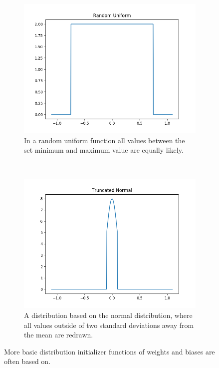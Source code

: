 \begin{figure}[h!]
\centering
	\begin{subfigure}[t]{0.4\textwidth}
		\centering
		\includegraphics[width=\textwidth]{img/methodology_neuralNetwork_initializerFunctions_randomUniform.png}
		\caption{In a random uniform function all values between the set minimum and maximum value are equally likely.}
	\end{subfigure}%
	~ 
	\begin{subfigure}[t]{0.4\textwidth}
		\centering
		\includegraphics[width=\textwidth]{img/methodology_neuralNetwork_initializerFunctions_truncatedNormal.png}
		\caption{A distribution based on the normal distribution, where all values outside of two standard deviations away from the mean are redrawn.}
	\end{subfigure}
	\caption{More basic distribution initializer functions of weights and biases are often based on.}
	\label{pic:methodology_neuralNetwork_initializerFunctions2}
\end{figure}

